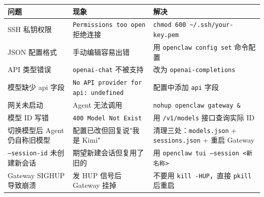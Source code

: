 \begin{table}[h]
\centering
\small
\begin{tabular}{|l|l|l|}
\hline
问题 & 现象 & 解决 \\
\hline
SSH 私钥权限 & \texttt{Permissions too open} 拒绝连接 & \texttt{chmod 600 \textasciitilde{}/.ssh/your-key.pem} \\
\hline
JSON 配置格式 & 手动编辑容易出错 & 用 \texttt{openclaw config set} 命令配置 \\
\hline
API 类型错误 & \texttt{openai-chat} 不被支持 & 改为 \texttt{openai-completions} \\
\hline
模型缺少 api 字段 & \texttt{No API provider for api: undefined} & 配置中添加 \texttt{api} 字段 \\
\hline
网关未启动 & Agent 无法调用 & \texttt{nohup openclaw gateway \&} \\
\hline
模型 ID 写错 & \texttt{400 Model Not Exist} & 用 \texttt{/v1/models} 接口查询实际 ID \\
\hline
切换模型后 Agent 仍自称旧模型 & 配置已改但回复说"我是 Kimi" & 清理三处：\texttt{models.json} + \texttt{sessions.json} + 重启 Gateway \\
\hline
\texttt{--session-id} 未创建新会话 & 期望新建会话但复用了旧的 & 用 \texttt{openclaw tui --session <新名称>} \\
\hline
Gateway SIGHUP 导致崩溃 & 发 HUP 信号后 Gateway 挂掉 & 不要用 \texttt{kill -HUP}，直接 \texttt{pkill} 后重启 \\
\hline
\end{tabular}
\end{table}


\clearpage
